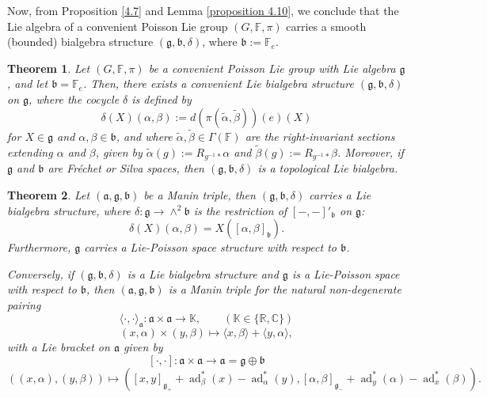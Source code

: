 \documentclass[11pt,reqno]{amsart}
\newtheorem{theorem}{Theorem}[section]
\theoremstyle{definition}
\numberwithin{equation}{section}
\begin{document}
 Now, from Proposition \ref{4.7} and Lemma \ref{proposition 4.10}, we conclude that the Lie algebra of a convenient Poisson Lie group $(G, \mathbb{F}, \pi)$ carries a smooth (bounded) bialgebra structure $(\mathfrak{g}, \mathfrak{b}, \delta)$, where $\mathfrak b:=\mathbb F_{e}.$
\begin{theorem}\label{D-0}
Let $(G, \mathbb{F}, \pi)$ be a convenient Poisson Lie group with Lie algebra $\mathfrak{g}$, and let $\mathfrak{b} = \mathbb{F}_e$. Then, there exists a convenient Lie bialgebra structure $(\mathfrak{g}, \mathfrak{b}, \delta)$ on $\mathfrak{g}$, where the cocycle $\delta$ is defined by
\[
\delta(X)(\alpha, \beta) := d(\pi(\tilde{\alpha}, \tilde{\beta}))(e)(X)
\]
for $X \in \mathfrak{g}$ and $\alpha, \beta \in \mathfrak{b}$, and where $\tilde{\alpha}, \tilde{\beta} \in \Gamma(\mathbb{F})$ are the right-invariant sections extending $\alpha$ and $\beta$, given by $\tilde{\alpha}(g) := R_{g^{-1}*}\alpha$ and $\tilde{\beta}(g) := R_{g^{-1}*}\beta$. Moreover, if $\mathfrak{g}$ and $\mathfrak{b}$ are Fréchet or Silva spaces, then $(\mathfrak{g}, \mathfrak{b}, \delta)$ is a topological Lie bialgebra.
\end{theorem}


\begin{theorem}\cite[Theorem 4.9]{32}
Let $(\mathfrak{a}, \mathfrak{g}, \mathfrak{b})$ be a Manin triple, then $(\mathfrak{g}, \mathfrak{b}, \delta)$ carries a Lie bialgebra structure, where $\delta : \mathfrak{g} \rightarrow \wedge^2\mathfrak{b}$ is the restriction of $[-,-]'_{\mathfrak{b}}$ on $\mathfrak{g}$:
\[
\delta(X)(\alpha, \beta) = X([\alpha, \beta]_{\mathfrak{b}}).
\]
Furthermore, $\mathfrak{g}$ carries a Lie-Poisson space structure with respect to $\mathfrak{b}$. 

Conversely, if $(\mathfrak{g}, \mathfrak{b}, \delta)$ is a Lie bialgebra structure and $\mathfrak{g}$ is a Lie-Poisson space with respect to $\mathfrak{b}$, then $(\mathfrak{a}, \mathfrak{g}, \mathfrak{b})$ is a Manin triple for the natural non-degenerate pairing
\[
\langle \cdot, \cdot \rangle_{\mathfrak{a}}: \mathfrak{a} \times \mathfrak{a} \rightarrow \mathbb{K}, \qquad (\mathbb K\in \{\mathbb R, \mathbb C\})
\]
\[
(x, \alpha) \times (y, \beta) \mapsto \langle x, \beta \rangle + \langle y, \alpha \rangle,
\]
with a Lie bracket on $\mathfrak{a}$ given by
\[
[\cdot, \cdot] : \mathfrak{a} \times \mathfrak{a} \rightarrow \mathfrak{a} = \mathfrak{g} \oplus \mathfrak{b}
\]
\[
((x, \alpha), (y, \beta)) \mapsto ([x, y]_{\mathfrak{g}_+} + \operatorname {ad}^*_{\beta}(x) - \operatorname{ad}^*_{\alpha}(y), [\alpha, \beta]_{\mathfrak{g}_-} + \operatorname{ad}^*_{y}(\alpha) - \operatorname{ad}^*_{x}(\beta)).
\]
\end{theorem}
\end{document}

